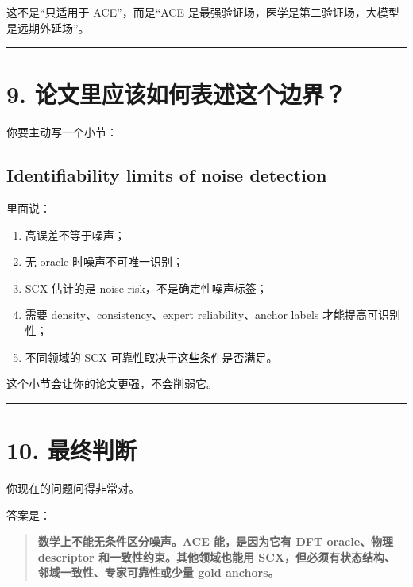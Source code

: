 \documentclass[
  12pt,
]{ctexart}
\providecommand{\tightlist}{%
  \setlength{\itemsep}{0pt}\setlength{\parskip}{0pt}}
\begin{document}
这不是``只适用于 ACE''，而是``ACE
是最强验证场，医学是第二验证场，大模型是远期外延场''。

\begin{center}\rule{0.5\linewidth}{0.5pt}\end{center}

\section{9.
论文里应该如何表述这个边界？}\label{ux8bbaux6587ux91ccux5e94ux8be5ux5982ux4f55ux8868ux8ff0ux8fd9ux4e2aux8fb9ux754c}

你要主动写一个小节：

\subsection{Identifiability limits of noise
detection}\label{identifiability-limits-of-noise-detection}

里面说：

\begin{enumerate}
\def\labelenumi{\arabic{enumi}.}
\tightlist
\item
  高误差不等于噪声；
\item
  无 oracle 时噪声不可唯一识别；
\item
  SCX 估计的是 noise risk，不是确定性噪声标签；
\item
  需要 density、consistency、expert reliability、anchor labels
  才能提高可识别性；
\item
  不同领域的 SCX 可靠性取决于这些条件是否满足。
\end{enumerate}

这个小节会让你的论文更强，不会削弱它。

\begin{center}\rule{0.5\linewidth}{0.5pt}\end{center}

\section{10. 最终判断}\label{ux6700ux7ec8ux5224ux65ad-4}

你现在的问题问得非常对。

答案是：

\begin{quote}
\textbf{数学上不能无条件区分噪声。ACE 能，是因为它有 DFT oracle、物理
descriptor 和一致性约束。其他领域也能用
SCX，但必须有状态结构、邻域一致性、专家可靠性或少量 gold anchors。}
\end{quote}
\end{document}
